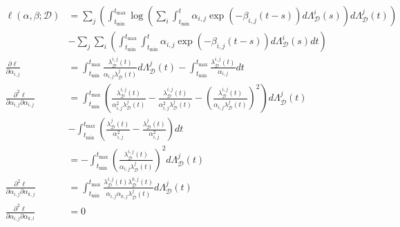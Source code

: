 \documentclass[honours,12pt]{unswthesis}
\numberwithin{equation}{section}
\begin{document}
\begin{equation*}
	\begin{align}
		\ell(\alpha,\beta; \mathcal{D}) & = \sum_j\left( \int_{t_\mathrm{min}}^{t_\mathrm{max}} \log\left(\sum_i \int_{t_\mathrm{min}}^t \alpha_{i,j}\exp(-\beta_{i,j}(t-s)) d\Lambda_\mathcal{D}^i(s)\right)d\Lambda_\mathcal{D}^j(t)\right) \\ & - \sum_j\sum_i\left( \int_{t_\mathrm{min}}^{t_\mathrm{max}} \int_{t_\mathrm{min}}^t \alpha_{i,j}\exp(-\beta_{i,j}(t-s))d\Lambda_\mathcal{D}^i(s) dt \right)
		\\
		\frac{\partial\ell}{\partial\alpha_{i,j}} &= \int_{t_\mathrm{min}}^{t_\mathrm{max}} \frac{\lambda_\mathcal{D}^{i,j}(t)}{\alpha_{i,j}\lambda_\mathcal{D}^j(t)}d\Lambda_\mathcal{D}^j(t) - \int_{t_\mathrm{min}}^{t_\mathrm{max}} \frac{\lambda_\mathcal{D}^{i,j}(t)}{\alpha_{i,j}}dt \\
		\frac{\partial^2\ell}{\partial\alpha_{i,j}\partial\alpha_{i,j}} &= \int_{t_\mathrm{min}}^{t_\mathrm{max}} \left( \frac{\lambda_\mathcal{D}^{i,j}(t)}{\alpha_{i,j}^2\lambda_\mathcal{D}^j(t)} - \frac{\lambda_\mathcal{D}^{i,j}(t)}{\alpha_{i,j}^2\lambda_\mathcal{D}^j(t)} - \left(\frac{\lambda_\mathcal{D}^{i,j}(t)}{\alpha_{i,j}\lambda_\mathcal{D}^j(t)}\right)^2 \right) d\Lambda_\mathcal{D}^j(t) \\&- \int_{t_\mathrm{min}}^{t_\mathrm{max}} \left( \frac{\lambda_\mathcal{D}^j(t)}{\alpha_{i,j}^2} - \frac{\lambda_\mathcal{D}^j(t)}{\alpha_{i,j}^2} \right) dt\\
		&= - \int_{t_\mathrm{min}}^{t_\mathrm{max}} \left(\frac{\lambda_\mathcal{D}^{i,j}(t)}{\alpha_{i,j}\lambda_\mathcal{D}^j(t)}\right)^2 d\Lambda_\mathcal{D}^j(t)\\
		\frac{\partial^2\ell}{\partial\alpha_{i,j}\partial\alpha_{k,j}} &= \int_{t_\mathrm{min}}^{t_\mathrm{max}} \frac{\lambda_\mathcal{D}^{i,j}(t)\lambda_\mathcal{D}^{k,j}(t)}{\alpha_{i,j}\alpha_{k,j}\lambda_\mathcal{D}^j(t)} d\Lambda_\mathcal{D}^j(t)\\
		\frac{\partial^2\ell}{\partial\alpha_{i,j}\partial\alpha_{k,l}}  &= 0\\
	\end{align}
\end{equation*}
\end{document}
